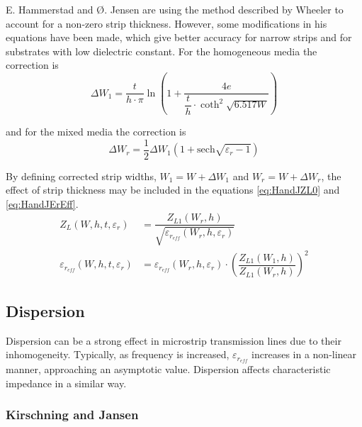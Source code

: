E. Hammerstad and {\O}. Jensen are using the method described by Wheeler
\cite{Wheeler} to account for a non-zero strip thickness.  However,
some modifications in his equations have been made, which give better
accuracy for narrow strips and for substrates with low dielectric
constant.  For the homogeneous media the correction is
\begin{equation}
\Delta W_1 = \dfrac{t}{h\cdot\pi} \ln{\left(1 + \dfrac{4e}{\dfrac{t}{h}\cdot \coth^2{\sqrt{6.517 W}}}\right)}
\end{equation}

and for the mixed media the correction is
\begin{equation}
\Delta W_r = \dfrac{1}{2} \Delta W_1 \left(1 + \text{sech} \sqrt{\varepsilon_r - 1}\right)
\end{equation}

By defining corrected strip widths, $W_1 = W + \Delta W_1$ and $W_r =
W + \Delta W_r$, the effect of strip thickness may be included in the
equations \eqref{eq:HandJZL0} and \eqref{eq:HandJErEff}.
\begin{align}
Z_L \left(W, h, t, \varepsilon_r\right) &= \dfrac{Z_{L1} \left(W_r, h\right)}{\sqrt{\varepsilon_{r_{eff}} \left(W_r, h, \varepsilon_r\right)}}\\
\varepsilon_{r_{eff}} \left(W, h, t, \varepsilon_r\right) &= \varepsilon_{r_{eff}} \left(W_r, h, \varepsilon_r\right) \cdot \left(\dfrac{Z_{L1} \left(W_1, h\right)}{Z_{L1} \left(W_r, h\right)}\right)^2
\end{align}

\subsection{Dispersion}

Dispersion can be a strong effect in microstrip transmission lines due
to their inhomogeneity.  Typically, as frequency is increased,
$\varepsilon_{r_{eff}}$ increases in a non-linear manner, approaching
an asymptotic value.  Dispersion affects characteristic impedance in a
similar way.

\subsubsection{Kirschning and Jansen}

